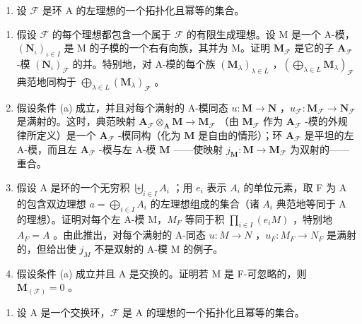 \begin{enumerate}
\def\labelenumi{\arabic{enumi}.}
\setcounter{enumi}{19}
\tightlist
\item
  设 \(\mathcal{F}\) 是环 A 的左理想的一个拓扑化且幂等的集合。
\end{enumerate}

\begin{enumerate}
\def\labelenumi{(\alph{enumi})}
\item
  假设 \(\mathcal{F}\) 的每个理想都包含一个属于 \(\mathcal{F}\) 的有限生成理想。设 M 是一个 A-模，\((\mathbf{N}_{\iota})_{\iota \in I}\) 是 M 的子模的一个右有向族，其并为 M。证明 \(\mathbf{M}_{\mathcal{F}}\) 是它的子 \(\mathbf{A}_{\mathcal{F}}\) -模 \((\mathbf{N}_{\iota})_{\mathcal{F}}\) 的并。特别地，对 A-模的每个族 \((\mathbf{M}_{\lambda})_{\lambda \in L}\) ，\(\left( \bigoplus_{\lambda \in L} \mathbf{M}_{\lambda} \right)_{\mathcal{F}}\) 典范地同构于 \(\bigoplus_{\lambda \in L} (\mathbf{M}_{\lambda})_{\mathcal{F}}\) 。
\item
  假设条件 (a) 成立，并且对每个满射的 A-模同态 \(u \colon \mathbf{M} \to \mathbf{N}\) ，\(u_{\mathcal{F}} \colon \mathbf{M}_{\mathcal{F}} \to \mathbf{N}_{\mathcal{F}}\) 是满射的。这时，典范映射 \(\mathbf{A}_{\mathcal{F}} \otimes_{\mathbf{A}} \mathbf{M} \to \mathbf{M}_{\mathcal{F}}\) （由 \(\mathbf{M}_{\mathcal{F}}\) 作为 \(\mathbf{A}_{\mathcal{F}}\) -模的外规律所定义）是一个 \(\mathbf{A}_{\mathcal{F}}\) -模同构（化为 \(\mathbf{M}\) 是自由的情形）；环 \(\mathbf{A}_{\mathcal{F}}\) 是平坦的左 A-模，而且左 \(\mathbf{A}_{\mathcal{F}}\) -模与左 A-模 \(\mathbf{M}\) ——使映射 \(j_{\mathbf{M}} \colon \mathbf{M} \to \mathbf{M}_{\mathcal{F}}\) 为双射的——重合。
\item
  假设 A 是环的一个无穷积 \(\biguplus_{i\in I}A_{i}\) ；用 \(e_{i}\) 表示 \(A_{i}\) 的单位元素，取 F 为 A 的包含双边理想 \(a=\bigoplus_{i\in I}A_{i}\) 的左理想组成的集合（诸 \(A_{i}\) 典范地等同于 A 的理想）。证明对每个左 A-模 M，\(M_{F}\) 等同于积 \(\prod_{i\in I}(e_{i}M)\) ，特别地 \(A_{F}=A\) 。由此推出，对每个满射的 A-同态 \(u: M\to N\) ，\(u_{F}: M_{F}\to N_{F}\) 是满射的，但给出使 \(j_{M}\) 不是双射的 A-模 M 的例子。
\item
  假设条件 (a) 成立并且 A 是交换的。证明若 M 是 F-可忽略的，则 \(\mathbf{M}_{(\mathcal{F})}=0\) 。
\end{enumerate}

\begin{enumerate}
\def\labelenumi{\arabic{enumi}.}
\setcounter{enumi}{20}
\tightlist
\item
  设 A 是一个交换环，\(\mathcal{F}\) 是 A 的理想的一个拓扑化且幂等的集合。
\end{enumerate}

